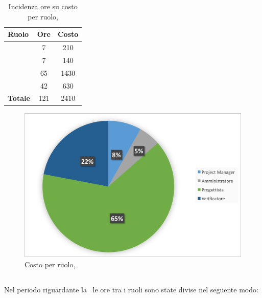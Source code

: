 \begin{table}[h]
	\begin{center}
		\begin{tabular}{|l|c|c|}
			\hline
			\textbf{Ruolo}	& \textbf{Ore} &	\textbf{Costo}	 \\
			\hline
			\textit{\Pm}	&	7	&	210\\
			\hline
			\textit{\Am}	&	7	&	140\\
			\hline
			\textit{\Prog}	&	65	&	1430\\
			\hline
			\textit{\Ver}	&	42	&	630\\
			\hline
			\textbf{Totale}	&	121	&	2410\\
			\hline
		\end{tabular}
	\end{center}
	\caption{Incidenza ore su costo per ruolo, \PD}
\end{table}

\begin{figure}[H]
	\centering 
	\includegraphics[scale=0.7]{Immagini/GraficiTorteSezione6/PD.png}
	\caption{Costo per ruolo, \PD}
\end{figure}

\newpage
\subsection{\COD}
Nel periodo riguardante la \COD\ le ore tra i ruoli sono state divise nel seguente modo:

